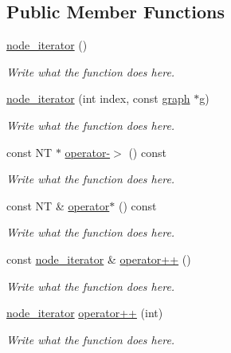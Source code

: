 \subsection*{Public Member Functions}
\begin{DoxyCompactItemize}
\item 
\hyperlink{classnode__iterator_aebbc8c2442fc9e08b644c602926b2a95}{node\+\_\+iterator} ()
\begin{DoxyCompactList}\small\item\em Write what the function does here. \end{DoxyCompactList}\item 
\hyperlink{classnode__iterator_a4def91423ff67aff9260028b702752e7}{node\+\_\+iterator} (int index, const \hyperlink{classgraph}{graph} $\ast$g)
\begin{DoxyCompactList}\small\item\em Write what the function does here. \end{DoxyCompactList}\item 
const N\+T $\ast$ \hyperlink{classnode__iterator_a8b8b05f0fc0e986927730f8aab0ca4ba}{operator-\/$>$} () const 
\begin{DoxyCompactList}\small\item\em Write what the function does here. \end{DoxyCompactList}\item 
const N\+T \& \hyperlink{classnode__iterator_ad56982099682e3c9d35e6b5f2b39bdce}{operator$\ast$} () const 
\begin{DoxyCompactList}\small\item\em Write what the function does here. \end{DoxyCompactList}\item 
const \hyperlink{classnode__iterator}{node\+\_\+iterator} \& \hyperlink{classnode__iterator_ad700a20e0bc9506385ef627ac5f25dc4}{operator++} ()
\begin{DoxyCompactList}\small\item\em Write what the function does here. \end{DoxyCompactList}\item 
\hyperlink{classnode__iterator}{node\+\_\+iterator} \hyperlink{classnode__iterator_afa625c56565fea48c4c9bb723c7ecb5c}{operator++} (int)
\begin{DoxyCompactList}\small\item\em Write what the function does here. \end{DoxyCompactList}\item 

\end{DoxyCompactItemize}
